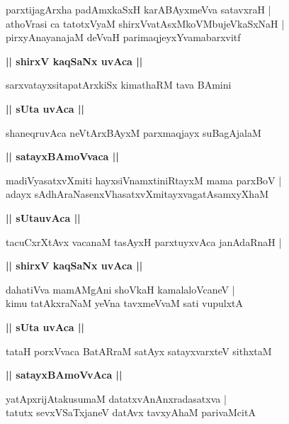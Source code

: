 \documentclass[twoside,12pt,openright]{book}
\newcounter{shloka}[chapter]
\def\uvaca#1{\centerline{{\large\textbf{#1}}}}
\begin{document}
\begin{shloka}%
parxtijagArxha padAmxkaSxH karABAyxmeVva satavxraH |\\
athoVrasi ca tatotxVyaM shirxVvatAsxMkoVMbujeVkaSxNaH |\\
pirxyAnayanajaM deVvaH parimaqjeyxYvamabarxvitf
\end{shloka}

\uvaca{|| shirxV kaqSaNx uvAca ||}

\begin{shloka}%
sarxvatayxsitapatArxkiSx kimathaRM tava BAmini
\end{shloka}

\uvaca{|| sUta uvAca ||}

\begin{shloka}%
shaneqruvAca neVtArxBAyxM parxmaqjayx suBagAjalaM 
\end{shloka}

\uvaca{|| satayxBAmoVvaca ||}

\begin{shloka}%
madiVyasatxvXmiti hayxsiVnamxtiniRtayxM mama parxBoV |\\
adayx sAdhAraNasenxVhasatxvXmitayxvagatAsamxyXhaM 
\end{shloka}

\uvaca{|| sUtauvAca ||}

\begin{shloka}%
tacuCxrXtAvx vacanaM tasAyxH parxtuyxvAca janAdaRnaH |\\
\end{shloka}

\uvaca{|| shirxV kaqSaNx uvAca ||}

\begin{shloka}%
dahatiVva mamAMgAni shoVkaH kamalaloVcaneV |\\
kimu tatAkxraNaM yeVna tavxmeVvaM sati vupulxtA 
\end{shloka}

\uvaca{|| sUta uvAca ||}

\begin{shloka}%
tataH porxVvaca BatARraM satAyx satayxvarxteV sithxtaM 
\end{shloka}

\uvaca{|| satayxBAmoVvAca ||}

\begin{shloka}%
yatApxrijAtakusumaM datatxvAnAnxradasatxva |\\
tatutx sevxVSaTxjaneV datAvx tavxyAhaM parivaMcitA 
\end{shloka}
\end{document}
